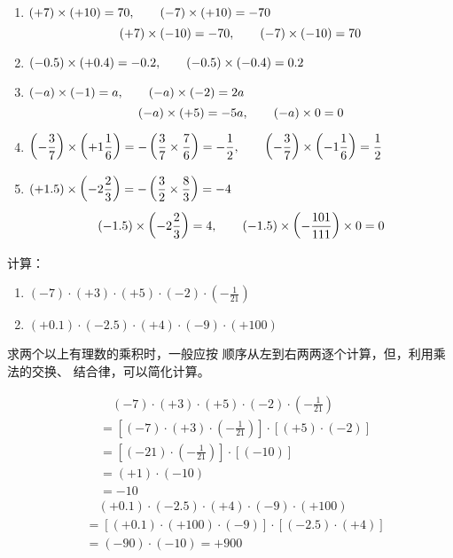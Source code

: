 \begin{solution}
\begin{enumerate}
\item $(+7)\times (+10)=70,\qquad (-7)\times (+10)=-70$ 
\[(+7)\times (-10)=-70,\qquad (-7)\times (-10)=70\]
\item $(-0.5)\times (+0.4)=-0.2,\qquad (-0.5)\times (-0.4)=0.2$
\item $(-a)\times (-1)=a,\qquad (-a)\times (-2)=2a$  $$(-a)\times (+5)=-5a,\qquad (-a)\times 0=0$$
\item $\left(-\dfrac{3}{7}\right)\times \left(+1\dfrac{1}{6}\right)=-\left(\dfrac{3}{7}\times\dfrac{7}{6}\right)=-\dfrac{1}{2},\qquad \left(-\dfrac{3}{7}\right)\times \left(-1\dfrac{1}{6}\right)=\dfrac{1}{2} $
\item  $(+1.5)\times \left(-2\dfrac{2}{3}\right)=-\left(\dfrac{3}{2}\times\dfrac{8}{3}\right)=-4$
\[(-1.5)\times \left(-2\dfrac{2}{3}\right)=4,\qquad (-1.5)\times \left(-\dfrac{101}{111}\right)\times 0=0 \]
\end{enumerate}

\end{solution}  

\begin{example}
    计算：
\begin{enumerate}
    \item $(-7) \cdot(+3) \cdot(+5) \cdot(-2) \cdot\left(-\frac{1}{21}\right)$
    \item 
    $(+0.1) \cdot(-2.5) \cdot(+4) \cdot(-9) \cdot(+100)$
\end{enumerate}
\end{example}

\begin{analyze}
    求两个以上有理数的乘积时，一般应按
    顺序从左到右两两逐个计算，但，利用乘法的交换、
    结合律，可以简化计算。
\end{analyze}

\begin{solution}
\begin{align*}
  &\quad   (-7) \cdot(+3) \cdot(+5) \cdot(-2) \cdot\left(-\frac{1}{21}\right)\\
  &=\left[(-7)\cdot (+3)\cdot \left(-\frac{1}{21}\right)\right]\cdot [(+5)\cdot (-2)]\tag{交换、结合律}\\
  &=\left[(-21)\cdot \left(-\frac{1}{21}\right)\right]\cdot [(-10)] \tag{异号相乘法则}\\
  &=(+1)\cdot (-10) \tag{同号相乘法则}\\
  &=-10 \tag{1的特性}
\end{align*} 
\begin{align*}
    &\quad (+0.1) \cdot(-2.5) \cdot(+4) \cdot(-9) \cdot(+100)\\
    &=[(+0.1)\cdot (+100)\cdot(-9)]\cdot[(-2.5)\cdot (+4)]\\
    &=(-90)\cdot (-10)=+900
\end{align*}    
\end{solution}

